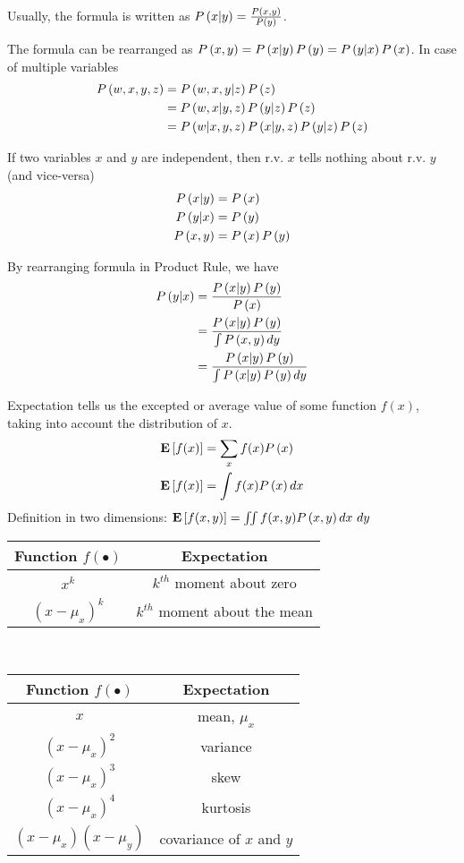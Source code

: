 \begin{description}[leftmargin=0cm]
Usually, the formula is written as $\P{x|y}=\frac{\P{x,y}}{\P{y}}$.
\item[Product Rule] The formula can be rearranged as $\P{x,y}=\P{x|y}\P{y}=\P{y|x}\P{x}$. In case of multiple variables
	\begin{align*}
	\P{w,x,y,z}&=\P{w,x,y|z}\P{z} \\
			   &=\P{w,x|y,z}\P{y|z}\P{z} \\
			   &=\P{w|x,y,z}\P{x|y,z}\P{y|z}\P{z}
	\end{align*}
\item[Independence] If two variables $x$ and $y$ are independent, then r.v. $x$ tells nothing about r.v. $y$ (and vice-versa)
	\begin{align*}
	\P{x|y}&=\P{x} \\
	\P{y|x}&=\P{y} \\
	\P{x,y}&=\P{x}\P{y}
	\end{align*}
\item[Baye's Rule] By rearranging formula in Product Rule, we have
	\begin{align*}
	\P{y|x}&=\frac{\P{x|y}\P{y}}{\P{x}} \\
		   &=\frac{\P{x|y}\P{y}}{\int\P{x,y}dy} \\
		   &=\frac{\P{x|y}\P{y}}{\int\P{x|y}\P{y}dy}
	\end{align*}
\item[Expectation] Expectation tells us the excepted or average value of some function $f(x)$, taking into account the distribution of $x$.
	\begin{align*}
	\E{f(x)}&=\sum_x f(x)\P{x} \\
	\E{f(x)}&=\int f(x)\P{x}dx
	\end{align*}
Definition in two dimensions: $\E{f(x,y)}=\iint f(x,y)\P{x,y}dx\ dy$
	\begin{table*}[!h]
		\centering
		\begin{tabular}{|c|c|}
			\hline
			Function $f(\bullet)$ & Expectation \\
			\hline
			$x^k$ & $k^{th}$ moment about zero \\
			\hline
			$(x-\mu_x)^k$ & $k^{th}$ moment about the mean \\
			\hline
		\end{tabular}
		\
		\begin{tabular}{|c|c|}
			\hline
			Function $f(\bullet)$ & Expectation \\
			\hline
			$x$ & mean, $\mu_x$ \\
			\hline
			$(x-\mu_x)^2$ & variance \\
			\hline
			$(x-\mu_x)^3$ & skew \\
			\hline
			$(x-\mu_x)^4$ & kurtosis \\
			\hline
			$(x-\mu_x)(x-\mu_y)$ & covariance of $x$ and $y$ \\
			\hline
		\end{tabular}
	\end{table*}


\end{description}
